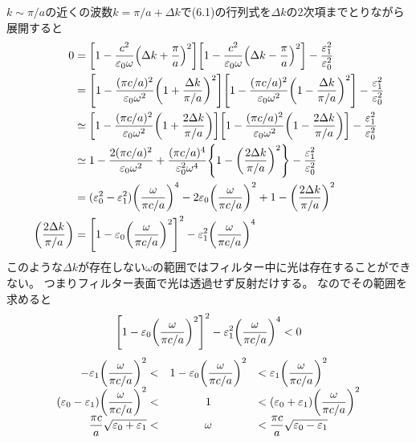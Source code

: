 \documentclass[../../master.tex]{subfiles}
\begin{document}
\section{}
\(k\sim \pi/a\)の近くの波数\(k= \pi/a+\Delta k\)で(6.1)の行列式を\(\Delta k\)の2次項までとりながら展開すると
\begin{equation}\begin{aligned}[b]
    0&=\qty[1-\frac{c^2}{\varepsilon_0\omega}\qty(\Delta k+\frac{\pi}{a})^2]
    \qty[1-\frac{c^2}{\varepsilon_0\omega}\qty(\Delta k-\frac{\pi}{a})^2]
    -\frac{\varepsilon_1^2}{\varepsilon_0^2}\\
    &=\qty[1-\frac{(\pi c/a)^2}{\varepsilon_0\omega^2}\qty(1+\frac{\Delta k}{\pi/a})^2]
    \qty[1-\frac{(\pi c/a)^2}{\varepsilon_0\omega^2}\qty(1-\frac{\Delta k}{\pi/a})^2]
    -\frac{\varepsilon_1^2}{\varepsilon_0^2}\\
    &\simeq \qty[1-\frac{(\pi c/a)^2}{\varepsilon_0\omega^2}\qty(1+\frac{2\Delta k}{\pi/a})]
    \qty[1-\frac{(\pi c/a)^2}{\varepsilon_0\omega^2}\qty(1-\frac{2\Delta k}{\pi/a})]
    -\frac{\varepsilon_1^2}{\varepsilon_0^2}\\
    &\simeq 1-\frac{2(\pi c/a)^2}{\varepsilon_0 \omega^2}
    +\frac{(\pi c/a)^4}{\varepsilon_0^2\omega^4}\qty{1-\qty(\frac{2\Delta k}{\pi/a})^2}
    -\frac{\varepsilon_1^2}{\varepsilon_0^2}\\
    &=(\varepsilon_0^2-\varepsilon_1^2)\qty(\frac{\omega}{\pi c/a})^4-2\varepsilon_0\qty(\frac{\omega}{\pi c/a})^2
    +1-\qty(\frac{2\Delta k}{\pi/a})^2\\
    \qty(\frac{2\Delta k}{\pi/a})&= \qty[1-\varepsilon_0\qty(\frac{\omega}{\pi c/a})^2]^2 - \varepsilon_1^2\qty(\frac{\omega}{\pi c/a})^4
\end{aligned}\end{equation}
このような\(\Delta k\)が存在しない\(\omega\)の範囲ではフィルター中に光は存在することができない。
つまりフィルター表面で光は透過せず反射だけする。
なのでその範囲を求めると
\begin{equation*}
    \qty[1-\varepsilon_0\qty(\dfrac{\omega}{\pi c/a})^2]^2- \varepsilon_1^2\qty(\dfrac{\omega}{\pi c/a})^4<0
\end{equation*}
\begin{equation}
    \begin{array}{rcl}
    -\varepsilon_1\qty(\dfrac{\omega}{\pi c/a})^2<&1-\varepsilon_0\qty(\dfrac{\omega}{\pi c/a})^2& < \varepsilon_1\qty(\dfrac{\omega}{\pi c/a})^2\\
    (\varepsilon_0-\varepsilon_1)\qty(\dfrac{\omega}{\pi c/a})^2<&1& < (\varepsilon_0+\varepsilon_1)\qty(\dfrac{\omega}{\pi c/a})^2\\
    \dfrac{\pi c}{a}\sqrt{\varepsilon_0+\varepsilon_1}<& \omega &< \dfrac{\pi c}{a}\sqrt{\varepsilon_0-\varepsilon_1}
\end{array}\end{equation}
\end{document}
